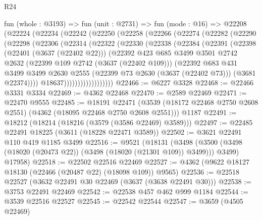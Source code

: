\begin{lexlean}{R24}
\begin{coremodule}
    fun (whole : @3193) =>
    fun (unit : @2731) =>
    fun (mode : @16) =>
    @22208
      (@22224
        (@22234
          (@22242
            (@22250
              (@22258
                (@22266
                  (@22274
                    (@22282
                      (@22290
                        (@22298
                          (@22306
                            (@22314
                              (@22322
                                (@22330
                                  (@22338
                                    (@22384
                                      (@22391
                                        (@22398
                                          (@22401 (@3637 (@22402 @22)))
                                          (@22392
                                            @423
                                            @685
                                            @3499
                                            @3501
                                            @2742
                                            @2632
                                            (@22399 @109 @2742 (@3637 (@22402 @109)))
                                            (@22392
                                              @683
                                              @431
                                              @3499
                                              @3499
                                              @2630
                                              @2555
                                              (@22399 @73 @2630 (@3637 (@22402 @73)))
                                              (@3681 @22374))))
                                        @18637))))))))))))))))))
@22466 := @6227 @3328
@22468 := @22466 @3331 @3334
@22469 := @4362 @22468
@22470 := @2589 @22469
@22471 := @22470 @9555
@22485 := @18191
    @22471
    (@3539 (@18172 @22468 @2750 @2608 @2551) (@4362 (@18095 @22468 @2750 @2608 @2551)))
    @1187
@22491 := @18212 (@18214 (@18216 (@3579 (@3586 @22469) @3589)))
@22497 := @22485 @22491 @18225 (@3611 (@18228 @22471 @3589))
@22502 := @3621 @22491 @110 @419 @1185 @3499
@22516 := @9521
    (@18131
      (@3498 (@3500 (@3498 (@18020 (@20473 @22)) (@3498 (@18020 (@21301 @109)) @3499))) @3499)
      @17958)
@22518 := @22502 @22516 @22469
@22527 := @4362 (@9622 @18127 @18130 (@22466 (@20487 @22) (@18098 @109)) @9565)
@22536 := @22518 @22527 (@3632 @22491 @30 @22469 (@3637 (@3638 @22491 @30)))
@22538 := @3753 @22491 @22469
@22542 := @22538 @457 @462 @999 @1184
@22544 := @3539 @22516 @22527
@22545 := @22542 @22544
@22547 := @3659 (@4505 @22469)

\end{coremodule}
\end{lexlean}
